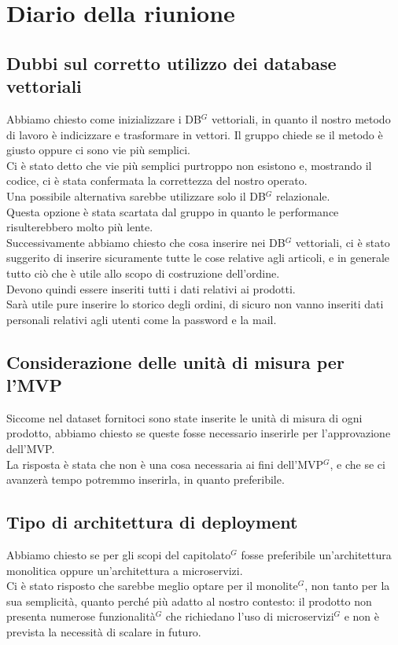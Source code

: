 \section{Diario della riunione}

\subsection{Dubbi sul corretto utilizzo dei database vettoriali}
Abbiamo chiesto come inizializzare i DB$^G$ vettoriali, in quanto il nostro metodo di lavoro è indicizzare e trasformare in vettori. Il gruppo chiede se il metodo è giusto oppure ci sono vie più semplici.\\
Ci è stato detto che vie più semplici purtroppo non esistono e, mostrando il codice, ci è stata confermata la correttezza del nostro operato.\\
Una possibile alternativa sarebbe utilizzare solo il DB$^G$ relazionale.\\
Questa opzione è stata scartata dal gruppo in quanto le performance risulterebbero molto più lente.\\
Successivamente abbiamo chiesto che cosa inserire nei DB$^G$ vettoriali, ci è stato suggerito di inserire sicuramente tutte le cose relative agli articoli, e in generale tutto ciò che è utile allo scopo di costruzione dell'ordine.\\
Devono quindi essere inseriti tutti i dati relativi ai prodotti.\\
Sarà utile pure inserire lo storico degli ordini, di sicuro non vanno inseriti dati personali relativi agli utenti come la password e la mail.

\subsection{Considerazione delle unità di misura per l'MVP}
Siccome nel dataset fornitoci sono state inserite le unità di misura di ogni prodotto, abbiamo chiesto se queste fosse necessario inserirle per l'approvazione dell'MVP.\\
La risposta è stata che non è una cosa necessaria ai fini dell'MVP$^G$, e che se ci avanzerà tempo potremmo inserirla, in quanto preferibile.

\subsection{Tipo di architettura di deployment}
Abbiamo chiesto se per gli scopi del capitolato$^G$ fosse preferibile un'architettura monolitica oppure un'architettura a microservizi.\\
Ci è stato risposto che sarebbe meglio optare per il monolite$^G$, non tanto per la sua semplicità, quanto perché più adatto al nostro contesto: il prodotto non presenta numerose funzionalità$^G$ che richiedano l'uso di microservizi$^G$ e non è prevista la necessità di scalare in futuro.

